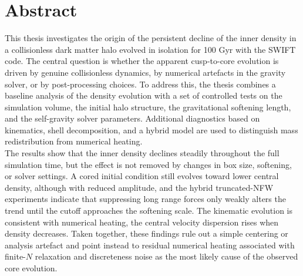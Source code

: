 

\cleardoublepage
\chapter*{Abstract}
This thesis investigates the origin of the persistent decline of the inner density in a collisionless dark matter halo evolved in isolation for 100 Gyr with the SWIFT code. The central question is whether the apparent cusp-to-core evolution is driven by genuine collisionless dynamics, by numerical artefacts in the gravity solver, or by post-processing choices. To address this, the thesis combines a baseline analysis of the density evolution with a set of controlled tests on the simulation volume, the initial halo structure, the gravitational softening length, and the self-gravity solver parameters. Additional diagnostics based on kinematics, shell decomposition, and a hybrid model are used to distinguish mass redistribution from numerical heating.\\

The results show that the inner density declines steadily throughout the full simulation time, but the effect is not removed by changes in box size, softening, or solver settings. A cored initial condition still evolves toward lower central density, although with reduced amplitude, and the hybrid truncated-NFW experiments indicate that suppressing long range forces only weakly alters the trend until the cutoff approaches the softening scale. The kinematic evolution is consistent with numerical heating, the central velocity dispersion rises when density decreases. Taken together, these findings rule out a simple centering or analysis artefact and point instead to residual numerical heating associated with finite-$N$ relaxation and discreteness noise as the most likely cause of the observed core evolution.


